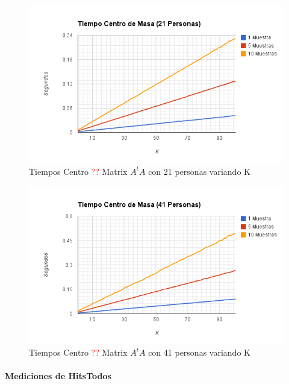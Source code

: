 \begin{figure}[H]
\includegraphics[width=1\textwidth]{img/imageh.png}
     \caption{Tiempos Centro \textcolor{red}{??} Matrix $A^tA$ con 21 personas variando K}
     \label{fig:figura1}
\end{figure}

\begin{figure}[H]
\includegraphics[width=1\textwidth]{img/imagei.png}
     \caption{Tiempos Centro \textcolor{red}{??} Matrix $A^tA$ con 41 personas variando K}
     \label{fig:figura1}
\end{figure}


\paragraph{Mediciones de HitsTodos}

